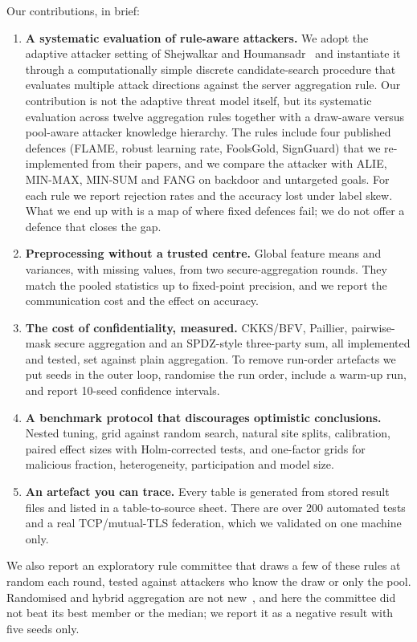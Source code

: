 \documentclass[conference]{IEEEtran}
\begin{document}
Our contributions, in brief:
\begin{enumerate}
\item \textbf{A systematic evaluation of rule-aware attackers.} We adopt the adaptive attacker setting of Shejwalkar and Houmansadr~\cite{shejwalkar2021} and instantiate it through a computationally simple discrete candidate-search procedure that evaluates multiple attack directions against the server aggregation rule. Our contribution is not the adaptive threat model itself, but its systematic evaluation across twelve aggregation rules together with a draw-aware versus pool-aware attacker knowledge hierarchy. The rules include four published defences (FLAME, robust learning rate, FoolsGold, SignGuard) that we re-implemented from their papers, and we compare the attacker with ALIE, MIN-MAX, MIN-SUM and FANG on backdoor and untargeted goals. For each rule we report rejection rates and the accuracy lost under label skew. What we end up with is a map of where fixed defences fail; we do not offer a defence that closes the gap.
\item \textbf{Preprocessing without a trusted centre.} Global feature means and variances, with missing values, from two secure-aggregation rounds. They match the pooled statistics up to fixed-point precision, and we report the communication cost and the effect on accuracy.
\item \textbf{The cost of confidentiality, measured.} CKKS/BFV, Paillier, pairwise-mask secure aggregation and an SPDZ-style three-party sum, all implemented and tested, set against plain aggregation. To remove run-order artefacts we put seeds in the outer loop, randomise the run order, include a warm-up run, and report 10-seed confidence intervals.
\item \textbf{A benchmark protocol that discourages optimistic conclusions.} Nested tuning, grid against random search, natural site splits, calibration, paired effect sizes with Holm-corrected tests, and one-factor grids for malicious fraction, heterogeneity, participation and model size.
\item \textbf{An artefact you can trace.} Every table is generated from stored result files and listed in a table-to-source sheet. There are over 200 automated tests and a real TCP/mutual-TLS federation, which we validated on one machine only.
\end{enumerate}
We also report an exploratory rule committee that draws a few of these rules at random each round, tested against attackers who know the draw or only the pool. Randomised and hybrid aggregation are not new~\cite{nabavirazavi2023randomization,yue2024hybrid}, and here the committee did not beat its best member or the median; we report it as a negative result with five seeds only.
\end{document}
